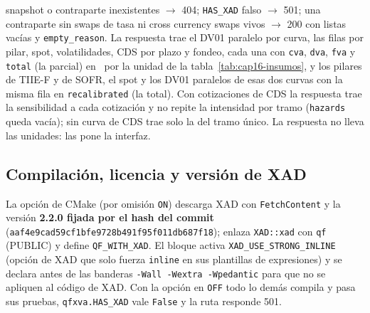 \begin{sloppypar}
snapshot o contraparte inexistentes $\to$ 404; \texttt{HAS\_XAD} falso $\to$ 501; una contraparte sin swaps de tasa ni
cross currency swaps vivos $\to$ 200 con listas vacías y \texttt{empty\_reason}. La respuesta trae el DV01 paralelo por
curva, las filas por pilar, spot, volatilidades, CDS por plazo y fondeo, cada una con \texttt{cva}, \texttt{dva},
\texttt{fva} y \texttt{total} (la parcial) en \MXN\ por la unidad de la tabla~\ref{tab:cap16-insumos}, y los pilares de
TIIE-F y de SOFR, el spot y los DV01 paralelos de esas dos curvas con la misma fila en \texttt{recalibrated} (la total).
Con cotizaciones de CDS la respuesta trae la sensibilidad a cada cotización y no repite la intensidad por tramo
(\texttt{hazards} queda vacía); sin curva de CDS trae solo la del tramo único. La respuesta no lleva las unidades: las
pone la interfaz.

\subsection{Compilación, licencia y versión de XAD}\label{sec:cap16-licencia}

La opción de CMake  (por omisión \texttt{ON}) descarga XAD con \texttt{FetchContent}
y la versión \textbf{2.2.0 fijada por el hash del commit}
(\texttt{aaf4e9cad59cf1bfe9728b491f95f011db687f18});  enlaza \texttt{XAD::xad}
con \texttt{qf} (PUBLIC) y define \texttt{QF\_WITH\_XAD}. El bloque activa \texttt{XAD\_USE\_STRONG\_INLINE} (opción de XAD que solo
fuerza \texttt{inline} en sus plantillas de expresiones) y se declara antes de las banderas \texttt{-Wall -Wextra
-Wpedantic} para que no se apliquen al código de XAD. Con la opción en \texttt{OFF} todo lo demás compila y pasa sus pruebas,
\texttt{qfxva.HAS\_XAD} vale \texttt{False} y la ruta responde 501.


\end{sloppypar}
